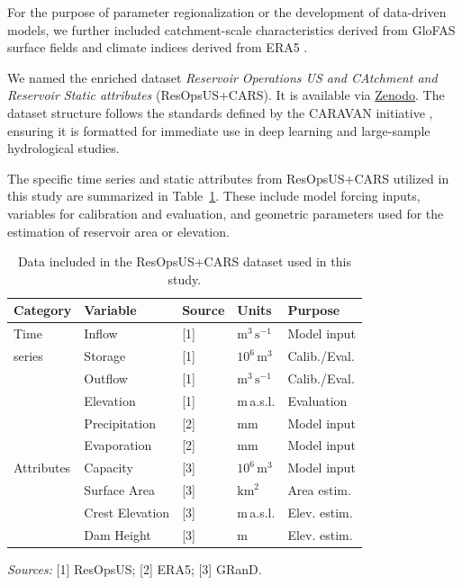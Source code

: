 \documentclass[hess, manuscript]{copernicus}
\begin{document}
For the purpose of parameter regionalization or the development of data-driven models, we further included catchment-scale characteristics derived from GloFAS surface fields \citep{Choulga2024} and climate indices derived from ERA5 \citep{Hersbach2020}. 

We named the enriched dataset \textit{Reservoir Operations US and CAtchment and Reservoir Static attributes} (ResOpsUS+CARS). It is available via \href{https://doi.org/10.5281/zenodo.15978041}{Zenodo}. The dataset structure follows the standards defined by the CARAVAN initiative \citep{Kratzert2023}, ensuring it is formatted for immediate use in deep learning and large-sample hydrological studies.

The specific time series and static attributes from ResOpsUS+CARS utilized in this study are summarized in Table~\ref{tab:data}. These include model forcing inputs, variables for calibration and evaluation, and geometric parameters used for the estimation of reservoir area or elevation.

\begin{table}[t]
    \centering
    \caption{Data included in the ResOpsUS+CARS dataset used in this study.}
    \label{tab:data}
    \begin{tabular*}{\columnwidth}{@{\extracolsep{\fill}}lllll}
        \toprule
        \textbf{Category} & \textbf{Variable} & \textbf{Source} & \textbf{Units} & \textbf{Purpose} \\
        \midrule
        Time & Inflow & [1] & $\text{m}^3\,\text{s}^{-1}$ & Model input \\
        series & Storage & [1] & $10^6\,\text{m}^3$ & Calib./Eval. \\
        & Outflow & [1] & $\text{m}^3\,\text{s}^{-1}$ & Calib./Eval. \\
        & Elevation & [1] & m\,a.s.l. & Evaluation \\
        & Precipitation & [2] & mm & Model input \\
        & Evaporation & [2] & mm & Model input \\
        \midrule
        Attributes & Capacity & [3] & $10^6\,\text{m}^3$ & Model input \\
        & Surface Area & [3] & $\text{km}^2$ & Area estim. \\
        & Crest Elevation & [3] & m\,a.s.l. & Elev. estim. \\
        & Dam Height & [3] & m & Elev. estim. \\
        \bottomrule
    \end{tabular*}
    \small
    \smallskip
    \textit{Sources:} [1] ResOpsUS; [2] ERA5; [3] GRanD.
\end{table}
\end{document}
